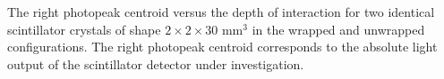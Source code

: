 \label{fig:lightoutput} The right photopeak centroid versus the depth of interaction for two identical scintillator crystals of shape $2\times2\times30$ mm$^3$ in the wrapped and unwrapped configurations. The right photopeak centroid corresponds to the absolute light output of the scintillator detector under investigation.